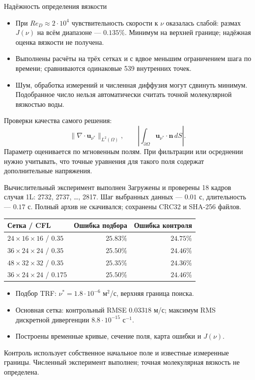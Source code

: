 \documentclass{beamer}
\newcommand{\U}{\mathbf{u}}
\begin{document}
\begin{frame}{Надёжность определения вязкости}
\small
\begin{itemize}
\item При $Re_D\approx2\cdot10^4$ чувствительность скорости к $\nu$
оказалась слабой: размах $J(\nu)$ на всём диапазоне --- $0.135\%$.
Минимум на верхней границе; надёжная оценка вязкости не получена.
\item Выполнены расчёты на трёх сетках и с вдвое меньшим ограничением
шага по времени; сравниваются одинаковые 539 внутренних точек.
\item Шум, обработка измерений и численная диффузия могут сдвинуть
минимум. Подобранное число нельзя автоматически считать точной
молекулярной вязкостью воды.
\end{itemize}
\medskip
Проверки качества самого решения:
\[
\|\nabla\cdot\U_{\nu^*}\|_{L^2(\Omega)},\qquad
\left|\int_{\partial\Omega}\U_{\nu^*}\cdot\mathbf n\,dS\right|.
\]
\footnotesize
Параметр оценивается по мгновенным полям. При фильтрации или осреднении
нужно учитывать, что точные уравнения для такого поля содержат дополнительные напряжения.
\end{frame}

\begin{frame}{Вычислительный эксперимент выполнен}
\small
Загружены и проверены 18 кадров случая 1L: 2732, 2737, \ldots, 2817.
Шаг выбранных данных --- $0.01$ с, длительность --- $0.17$ с.
Полный архив не скачивался; сохранены CRC32 и SHA-256 файлов.
\medskip

\begin{tabular}{@{}lrr@{}}
\toprule
Сетка / CFL & Ошибка подбора & Ошибка контроля \\
\midrule
$24\times16\times16$ / $0.35$ & $25.83\%$ & $24.75\%$ \\
$36\times24\times24$ / $0.35$ & $25.50\%$ & $24.46\%$ \\
$48\times32\times32$ / $0.35$ & $25.35\%$ & $24.36\%$ \\
$36\times24\times24$ / $0.175$ & $25.50\%$ & $24.46\%$ \\
\bottomrule
\end{tabular}
\medskip

\begin{itemize}
\item Подбор TRF: $\nu^*=1.8\cdot10^{-6}$ м$^2$/с, верхняя граница поиска.
\item Основная сетка: контрольный RMSE $0.03318$ м/с;
максимум RMS дискретной дивергенции $8.8\cdot10^{-15}$ с$^{-1}$.
\item Построены временные кривые, сечение поля, карта ошибки и $J(\nu)$.
\end{itemize}
\footnotesize
Контроль использует собственное начальное поле и известные измеренные границы.
Численный эксперимент выполнен; точная молекулярная вязкость не определена.
\end{frame}
\end{document}

